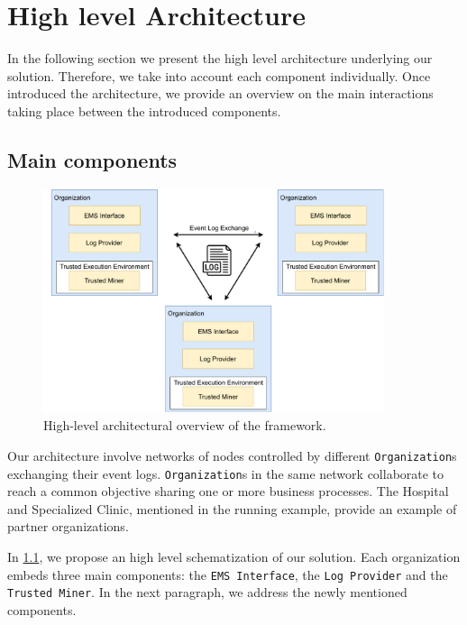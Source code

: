 \section{High level Architecture}
In the following section we present the high level architecture underlying our solution. Therefore, we take into account each component individually. Once introduced the architecture, we provide an overview on the main interactions taking place between the introduced components.
\subsection{Main components}
\label{fig:architecture_diagram}
\begin{figure}[t]
\centering
\includegraphics[width=10cm]{content/figures/architecture_diagram.pdf}
\caption{High-level architectural overview of the framework.}
\label{fig:implementation}
\end{figure}
Our architecture involve networks of nodes controlled by different \texttt{Organization}s exchanging their event logs. \texttt{Organization}s in the same network collaborate to reach a common objective sharing one or more business processes. The Hospital and Specialized Clinic, mentioned in the running example, provide an example of partner organizations.

In \cref{fig:architecture_diagram}, we propose an high level schematization of our solution. Each organization embeds three main components: the \texttt{EMS Interface}, the \texttt{Log Provider} and the \texttt{Trusted Miner}. %
In the next paragraph, we address the newly mentioned components.
